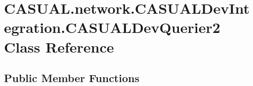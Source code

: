 \hypertarget{class_c_a_s_u_a_l_1_1network_1_1_c_a_s_u_a_l_dev_integration_1_1_c_a_s_u_a_l_dev_querier2}{\section{C\-A\-S\-U\-A\-L.\-network.\-C\-A\-S\-U\-A\-L\-Dev\-Integration.\-C\-A\-S\-U\-A\-L\-Dev\-Querier2 Class Reference}
\label{class_c_a_s_u_a_l_1_1network_1_1_c_a_s_u_a_l_dev_integration_1_1_c_a_s_u_a_l_dev_querier2}
}
\subsection*{Public Member Functions}
